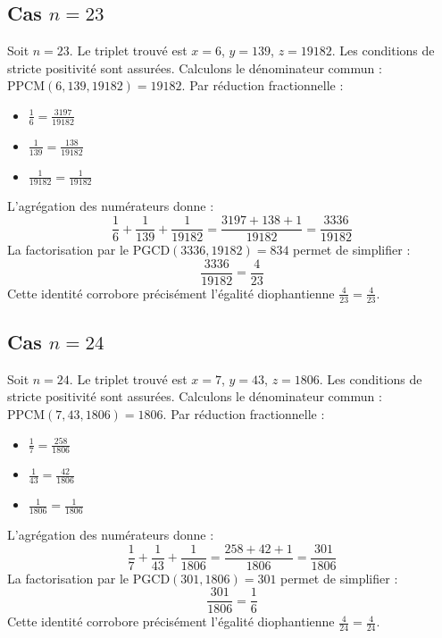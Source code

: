 \documentclass[11pt,a4paper]{article}
\begin{document}
\subsection{Cas $n = 23$}
Soit $n = 23$. Le triplet trouvé est $x = 6$, $y = 139$, $z = 19182$.
Les conditions de stricte positivité sont assurées.
Calculons le dénominateur commun : $\text{PPCM}(6, 139, 19182) = 19182$.
Par réduction fractionnelle :
\begin{itemize}
    \item $\frac{1}{6} = \frac{3197}{19182}$
    \item $\frac{1}{139} = \frac{138}{19182}$
    \item $\frac{1}{19182} = \frac{1}{19182}$
\end{itemize}
L'agrégation des numérateurs donne :
$$ \frac{1}{6} + \frac{1}{139} + \frac{1}{19182} = \frac{3197 + 138 + 1}{19182} = \frac{3336}{19182} $$
La factorisation par le $\text{PGCD}(3336, 19182) = 834$ permet de simplifier :
$$ \frac{3336}{19182} = \frac{4}{23} $$
Cette identité corrobore précisément l'égalité diophantienne $\frac{4}{23} = \frac{4}{23}$.

\subsection{Cas $n = 24$}
Soit $n = 24$. Le triplet trouvé est $x = 7$, $y = 43$, $z = 1806$.
Les conditions de stricte positivité sont assurées.
Calculons le dénominateur commun : $\text{PPCM}(7, 43, 1806) = 1806$.
Par réduction fractionnelle :
\begin{itemize}
    \item $\frac{1}{7} = \frac{258}{1806}$
    \item $\frac{1}{43} = \frac{42}{1806}$
    \item $\frac{1}{1806} = \frac{1}{1806}$
\end{itemize}
L'agrégation des numérateurs donne :
$$ \frac{1}{7} + \frac{1}{43} + \frac{1}{1806} = \frac{258 + 42 + 1}{1806} = \frac{301}{1806} $$
La factorisation par le $\text{PGCD}(301, 1806) = 301$ permet de simplifier :
$$ \frac{301}{1806} = \frac{1}{6} $$
Cette identité corrobore précisément l'égalité diophantienne $\frac{4}{24} = \frac{4}{24}$.
\end{document}
